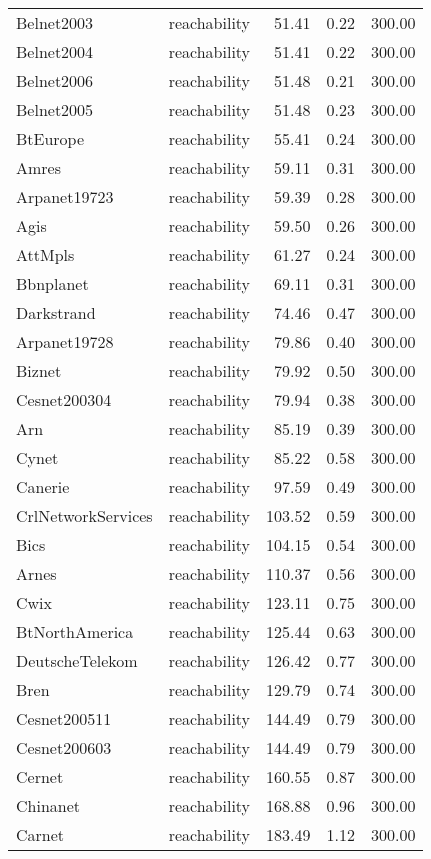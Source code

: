 \begin{tabular}{llrrr}
Belnet2003 & reachability & 51.41 & 0.22 & 300.00 \\
Belnet2004 & reachability & 51.41 & 0.22 & 300.00 \\
Belnet2006 & reachability & 51.48 & 0.21 & 300.00 \\
Belnet2005 & reachability & 51.48 & 0.23 & 300.00 \\
BtEurope & reachability & 55.41 & 0.24 & 300.00 \\
Amres & reachability & 59.11 & 0.31 & 300.00 \\
Arpanet19723 & reachability & 59.39 & 0.28 & 300.00 \\
Agis & reachability & 59.50 & 0.26 & 300.00 \\
AttMpls & reachability & 61.27 & 0.24 & 300.00 \\
Bbnplanet & reachability & 69.11 & 0.31 & 300.00 \\
Darkstrand & reachability & 74.46 & 0.47 & 300.00 \\
Arpanet19728 & reachability & 79.86 & 0.40 & 300.00 \\
Biznet & reachability & 79.92 & 0.50 & 300.00 \\
Cesnet200304 & reachability & 79.94 & 0.38 & 300.00 \\
Arn & reachability & 85.19 & 0.39 & 300.00 \\
Cynet & reachability & 85.22 & 0.58 & 300.00 \\
Canerie & reachability & 97.59 & 0.49 & 300.00 \\
CrlNetworkServices & reachability & 103.52 & 0.59 & 300.00 \\
Bics & reachability & 104.15 & 0.54 & 300.00 \\
Arnes & reachability & 110.37 & 0.56 & 300.00 \\
Cwix & reachability & 123.11 & 0.75 & 300.00 \\
BtNorthAmerica & reachability & 125.44 & 0.63 & 300.00 \\
DeutscheTelekom & reachability & 126.42 & 0.77 & 300.00 \\
Bren & reachability & 129.79 & 0.74 & 300.00 \\
Cesnet200511 & reachability & 144.49 & 0.79 & 300.00 \\
Cesnet200603 & reachability & 144.49 & 0.79 & 300.00 \\
Cernet & reachability & 160.55 & 0.87 & 300.00 \\
Chinanet & reachability & 168.88 & 0.96 & 300.00 \\
Carnet & reachability & 183.49 & 1.12 & 300.00 \\

\end{tabular}
